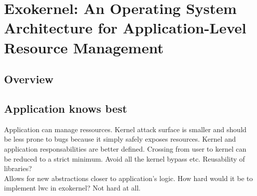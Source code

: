 \section{Exokernel: An Operating System Architecture for Application-Level Resource Management}

\subsection{Overview}

\subsection{Application knows best}
%
%
%
%
% 
% 
% 
% 
% 
% 

Application can manage ressources.
Kernel attack surface is smaller and should be less prone to bugs because it simply safely exposes resources.
Kernel and application responsabilities are better defined.
Crossing from user to kernel can be reduced to a strict minimum.
Avoid all the kernel bypass etc.
Reusability of libraries?\\

Allows for new abstractions closer to application's logic.
How hard would it be to implement lwc in exokernel? Not hard at all.\\

